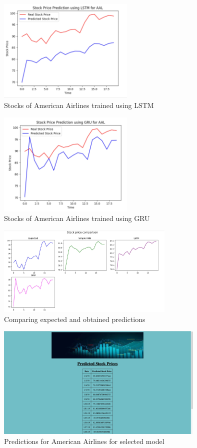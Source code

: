 \documentclass{article}
\begin{document}
\begin{figure}[htp]
    \centering
    \includegraphics[width=6.5cm]{AAL_LSTM.jpg}
    \caption{Stocks of American Airlines trained using LSTM}
\end{figure}

\begin{figure}[htp]
    \centering
    \includegraphics[width=6.5cm]{AAL_GRU.jpg}
    \caption{Stocks of American Airlines trained using GRU}
\end{figure}

\begin{figure}[htp]
    \centering
    \includegraphics[width=8.5cm]{AAL_ALL.jpg}
    \caption{Comparing expected and obtained predictions}
\end{figure}

\begin{figure}[htp]
    \centering
    \includegraphics[width=10cm]{AAL_PRED.jpg}
    \caption{Predictions for American Airlines for selected model}
\end{figure}
\end{document}
